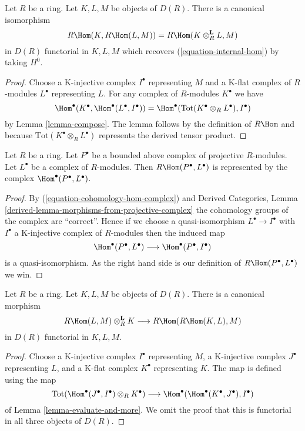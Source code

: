 \begin{lemma}
\label{lemma-internal-hom}
Let $R$ be a ring. Let $K, L, M$ be objects of $D(R)$. There is a canonical
isomorphism
$$
R\Hom(K, R\Hom(L, M)) = R\Hom(K \otimes_R^\mathbf{L} L, M)
$$
in $D(R)$ functorial in $K, L, M$ which recovers
(\ref{equation-internal-hom}) by taking $H^0$.
\end{lemma}

\begin{proof}
Choose a K-injective complex $I^\bullet$ representing
$M$ and a K-flat complex of $R$-modules $L^\bullet$
representing $L$. For any complex of $R$-modules $K^\bullet$
we have
$$
\Hom^\bullet(K^\bullet, \Hom^\bullet(L^\bullet, I^\bullet)) =
\Hom^\bullet(\text{Tot}(K^\bullet \otimes_R L^\bullet), I^\bullet)
$$
by Lemma \ref{lemma-compose}. The lemma follows by the definition
of $R\Hom$ and because
$\text{Tot}(K^\bullet \otimes_R L^\bullet)$
represents the derived tensor product.
\end{proof}

\begin{lemma}
\label{lemma-RHom-out-of-projective}
Let $R$ be a ring. Let $P^\bullet$ be a bounded above complex
of projective $R$-modules. Let $L^\bullet$ be a complex of $R$-modules.
Then $R\Hom(P^\bullet, L^\bullet)$ is represented by the complex
$\Hom^\bullet(P^\bullet, L^\bullet)$.
\end{lemma}

\begin{proof}
By (\ref{equation-cohomology-hom-complex}) and
Derived Categories, Lemma \ref{derived-lemma-morphisms-from-projective-complex}
the cohomology groups of the complex are ``correct''.
Hence if we choose a quasi-isomorphism $L^\bullet \to I^\bullet$
with $I^\bullet$ a K-injective complex of $R$-modules
then the induced map
$$
\Hom^\bullet(P^\bullet, L^\bullet)
\longrightarrow
\Hom^\bullet(P^\bullet, I^\bullet)
$$
is a quasi-isomorphism. As the right hand side is our definition
of $R\Hom(P^\bullet, L^\bullet)$ we win.
\end{proof}

\begin{lemma}
\label{lemma-internal-hom-evaluate}
Let $R$ be a ring. Let $K, L, M$ be objects of $D(R)$.
There is a canonical morphism
$$
R\Hom(L, M) \otimes_R^\mathbf{L} K
\longrightarrow
R\Hom(R\Hom(K, L), M)
$$
in $D(R)$ functorial in $K, L, M$.
\end{lemma}

\begin{proof}
Choose
a K-injective complex $I^\bullet$ representing $M$,
a K-injective complex $J^\bullet$ representing $L$, and
a K-flat complex $K^\bullet$ representing $K$.
The map is defined using the map
$$
\text{Tot}(\Hom^\bullet(J^\bullet, I^\bullet) \otimes_R K^\bullet)
\longrightarrow
\Hom^\bullet(\Hom^\bullet(K^\bullet, J^\bullet), I^\bullet)
$$
of Lemma \ref{lemma-evaluate-and-more}. We omit the proof that
this is functorial in all three objects of $D(R)$.
\end{proof}

